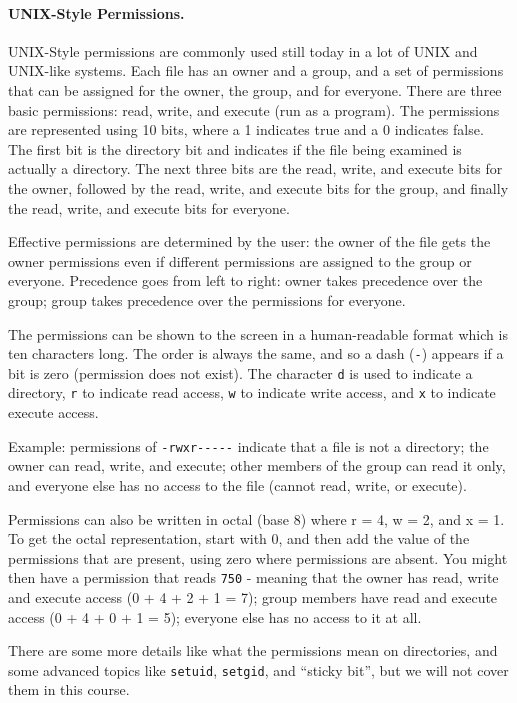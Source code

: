 \documentclass[a4paper]{report}
\begin{document}
\paragraph{UNIX-Style Permissions.}
UNIX-Style permissions are commonly used still today in a lot of UNIX and UNIX-like systems. Each file has an owner and a group, and a set of permissions that can be assigned for the owner, the group, and for everyone. There are three basic permissions: read, write, and execute (run as a program). The permissions are represented using 10 bits, where a 1 indicates true and a 0 indicates false. The first bit is the directory bit and indicates if the file being examined is actually a directory. The next three bits are the read, write, and execute bits for the owner, followed by the read, write, and execute bits for the group, and finally the read, write, and execute bits for everyone.

Effective permissions are determined by the user: the owner of the file gets the owner permissions even if different permissions are assigned to the group or everyone. Precedence goes from left to right: owner takes precedence over the group; group takes precedence over the permissions for everyone.

The permissions can be shown to the screen in a human-readable format which is ten characters long. The order is always the same, and so a dash (\texttt{-}) appears if a bit is zero (permission does not exist). The character \texttt{d} is used to indicate a directory, \texttt{r} to indicate read access, \texttt{w} to indicate write access, and \texttt{x} to indicate execute access.

Example: permissions of \texttt{-rwxr{-}{-}{-}{-}{-}} indicate that a file is not a directory; the owner can read, write, and execute; other members of the group can read it only, and everyone else has no access to the file (cannot read, write, or execute).

Permissions can also be written in octal (base 8) where r = 4, w = 2, and x = 1. To get the octal representation, start with 0, and then add the value of the  permissions that are present, using zero where permissions are absent. You might then have a permission that reads \texttt{750} - meaning that the owner has read, write and execute access (0 + 4 + 2 + 1 = 7); group members have read and execute access (0 + 4 + 0 + 1 = 5); everyone else has no access to it at all.

There are some more details like what the permissions mean on directories, and some advanced topics like \texttt{setuid}, \texttt{setgid}, and ``sticky bit'', but we will not cover them in this course.
\end{document}
